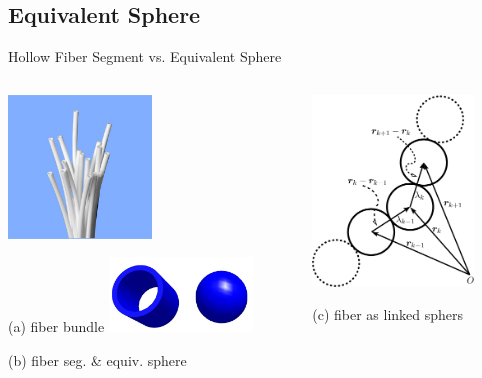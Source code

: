 \documentclass[t,presentation]{beamer}
\begin{document}
\subsection{Equivalent Sphere}
\label{sec:orgfd2df02}
\begin{frame}[label={sec:org106a788}]{Hollow Fiber Segment vs. Equivalent Sphere}
\vspace{0.25cm}
\begin{columns}[c]
\begin{column}{.45\textwidth}
\centering
\includegraphics[width=1.5in]{figures/hydroblue.jpg}\par
(a) fiber bundle
\includegraphics[width=1.5in]{figures/equiv-sphere.jpg}\par
(b) fiber seg. \& equiv. sphere
\end{column}
\begin{column}{.45\textwidth} %
\centering
\includegraphics[height=2in]{figures/fig-trimer-rot-crop2-1.png}\par
(c) fiber as linked sphers
\end{column}
\end{columns}
\end{frame}
\end{document}
